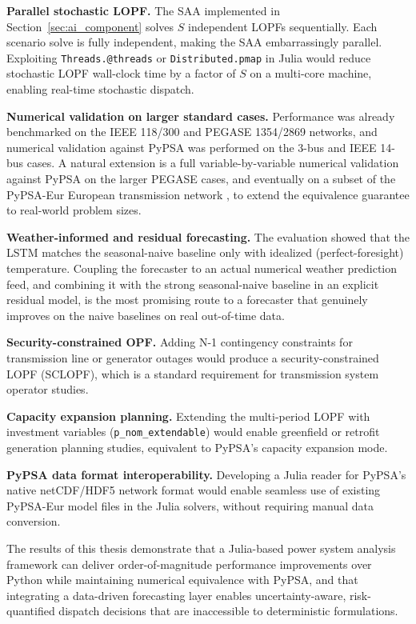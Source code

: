 \textbf{Parallel stochastic LOPF.}
The SAA implemented in Section~\ref{sec:ai_component} solves $S$ independent LOPFs sequentially. Each scenario solve is fully independent, making the SAA embarrassingly parallel. Exploiting \texttt{Threads.@threads} or \texttt{Distributed.pmap} in Julia would reduce stochastic LOPF wall-clock time by a factor of $S$ on a multi-core machine, enabling real-time stochastic dispatch.

\textbf{Numerical validation on larger standard cases.}
Performance was already benchmarked on the IEEE 118/300 and PEGASE 1354/2869 networks, and numerical validation against PyPSA was performed on the 3-bus and IEEE 14-bus cases. A natural extension is a full variable-by-variable numerical validation against PyPSA on the larger PEGASE cases, and eventually on a subset of the PyPSA-Eur European transmission network \cite{horsch2018pypsa_eur}, to extend the equivalence guarantee to real-world problem sizes.

\textbf{Weather-informed and residual forecasting.}
The evaluation showed that the LSTM matches the seasonal-naive baseline only with idealized (perfect-foresight) temperature. Coupling the forecaster to an actual numerical weather prediction feed, and combining it with the strong seasonal-naive baseline in an explicit residual model, is the most promising route to a forecaster that genuinely improves on the naive baselines on real out-of-time data.

\textbf{Security-constrained OPF.}
Adding N-1 contingency constraints for transmission line or generator outages would produce a security-constrained LOPF (SCLOPF), which is a standard requirement for transmission system operator studies.

\textbf{Capacity expansion planning.}
Extending the multi-period LOPF with investment variables (\texttt{p\_nom\_extendable}) would enable greenfield or retrofit generation planning studies, equivalent to PyPSA's capacity expansion mode.

\textbf{PyPSA data format interoperability.}
Developing a Julia reader for PyPSA's native netCDF/HDF5 network format would enable seamless use of existing PyPSA-Eur model files in the Julia solvers, without requiring manual data conversion.

The results of this thesis demonstrate that a Julia-based power system analysis framework can deliver order-of-magnitude performance improvements over Python while maintaining numerical equivalence with PyPSA, and that integrating a data-driven forecasting layer enables uncertainty-aware, risk-quantified dispatch decisions that are inaccessible to deterministic formulations.
